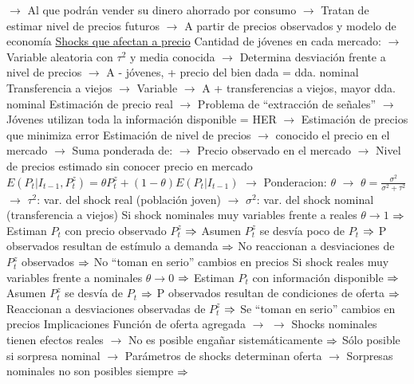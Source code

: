 \documentclass{nuevotema}
\begin{document}
\begin{esquemal}
				\4[] $\to$ Al que podrán vender su dinero ahorrado por consumo
				\4[] $\to$ Tratan de estimar nivel de precios futuros
				\4[] $\to$ A partir de precios observados y modelo de economía
				\4[] \underline{Shocks que afectan a precio}
				\4[] Cantidad de jóvenes en cada mercado:
				\4[] $\to$ Variable aleatoria con $\tau^2$ y media conocida
				\4[] $\to$ Determina desviación frente a nivel de precios
				\4[] $\to$ A - jóvenes, + precio del bien dada = dda. nominal
				\4[] Transferencia a viejos
				\4[] $\to$ Variable
				\4[] $\to$ A + transferencias a viejos, mayor dda. nominal
				\4[] Estimación de precio real
				\4[] $\to$ Problema de ``extracción de señales''
				\4[] $\to$ Jóvenes utilizan toda la información disponible = HER
				\4[] $\to$ Estimación de precios que minimiza error
				\4[] Estimación de nivel de precios
				\4[] $\to$ conocido el precio en el mercado
				\4[] $\to$ Suma ponderada de:
				\4[] $\to$ Precio observado en el mercado
				\4[] $\to$ Nivel de precios estimado sin conocer precio en mercado
				\4[] $E(P_t | I_{t-1}, P_t^z) = \theta  P_t^z + (1- \theta) E (P_t | I_{t-1})$
				\4[] $\to$ Ponderacion: $\theta$
				\4[] $\to$ $\theta = \frac{\sigma^2}{\sigma^2 + \tau^2}$
				\4[] $\to$ $\tau^2$: var. del shock real (población joven)
				\4[] $\to$ $\sigma^2$: var. del shock nominal (transferencia a viejos)
				\4[] Si shock nominales muy variables frente a reales
				\4[] $\theta \to 1$
				\4[] $\Rightarrow$ Estiman $P_t$ con precio observado $P_t^z$
				\4[] $\Rightarrow$ Asumen $P_t^z$ se desvía poco de $P_t$
				\4[] $\Rightarrow$ P observados resultan de estímulo a demanda
				\4[] $\Rightarrow$ No reaccionan a desviaciones de $P_t^z$ observados
				\4[] $\Rightarrow$ No ``toman en serio'' cambios en precios
				\4[] Si shock reales muy variables frente a nominales
				\4[] $\theta \to 0$
				\4[] $\Rightarrow$ Estiman $P_t$ con información disponible
				\4[] $\Rightarrow$ Asumen $P_t^z$ se desvía de $P_t$
				\4[] $\Rightarrow$ P observados resultan de condiciones de oferta
				\4[] $\Rightarrow$ Reaccionan a desviaciones observadas de $P_t^z$
				\4[] $\Rightarrow$ Se ``toman en serio'' cambios en precios
				\4 Implicaciones
				\4[] Función de oferta agregada
				\4[] $\to$ 
				\4[] $\to$ Shocks nominales tienen efectos reales
				\4[] $\to$ No es posible engañar sistemáticamente
				\4[] $\Rightarrow$ Sólo posible si sorpresa nominal
				\4[] $\to$ Parámetros de shocks determinan oferta
				\4[] $\to$ Sorpresas nominales no son posibles siempre
				\4[] $\Rightarrow$ 

\end{esquemal}
\end{document}
